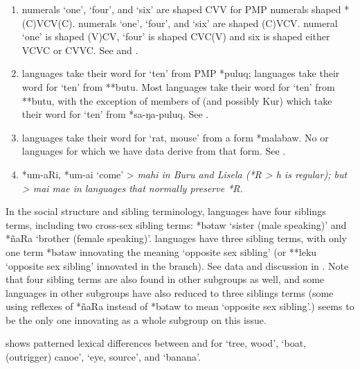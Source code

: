\begin{enumerate}
	\item	{} numerals ‘one’,
				‘four’, and ‘six’ are shaped CVV for PMP numerals shaped *(C)VCV(C).
				 numerals ‘one’, ‘four’,
				and ‘six’ are shaped (C)VCV.
				 numeral ‘one’ is shaped (V)CV,
				‘four’ is shaped CVC(V)
				and six is shaped either VCVC or CVVC.
				See  and .
	\item	{} languages take their word for ‘ten’
				from PMP *puluq;  languages take their word
				for ‘ten’ from **butu.
				Most  languages take their word
				for ‘ten’ from **butu,
				with the exception of members of  (and possibly
				Kur) which take their word for ‘ten’ from *sa-ŋa-puluq. See .
	\item	{} languages take their word for ‘rat,
				mouse’ from a form *malabaw.
				No  or  languages
				for which we have data derive from that form. See .
	\item	{} *um-aRi,
				*um-ai ‘come’ > \it{mahi} in Buru
				and Lisela (*R > \it{h} is regular); but > \it{mai {\tl} mae}
				in  languages that normally preserve *R.
\end{enumerate}

In the social structure
and sibling terminology,  languages have four
siblings terms, including two cross-sex sibling terms: *bətaw ‘sister (male speaking)’
and *ñaRa ‘brother (female speaking)’.
 languages have three sibling terms,
with only one term *bətaw innovating the meaning ‘opposite sex
sibling’ (or **leku ‘opposite sex sibling’ innovated in the  branch).
See data and discussion in .
Note that four sibling terms are also found in other subgroups
as well, and some languages in other subgroups have also reduced to three
siblings terms (some using reflexes of *ñaRa instead of *bətaw
to mean ‘opposite sex sibling’.)  seems to be
the only one innovating as a whole subgroup on this issue.

 shows patterned lexical differences between 
and  for ‘tree,
wood’, ‘boat, (outrigger) canoe’, ‘eye,
source’, and ‘banana’.

